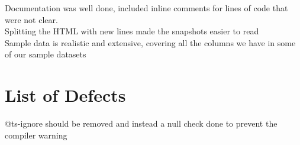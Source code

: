 \documentclass{article}
\begin{document}
Documentation was well done, included inline comments for lines of code that were not clear.\\
Splitting the HTML with new lines made the snapshots easier to read\\
Sample data is realistic and extensive, covering all the columns we have in some of our sample datasets\\

\pagebreak

\section{List of Defects}
@ts-ignore should be removed and instead a null check done to prevent the compiler warning\\
\end{document}
